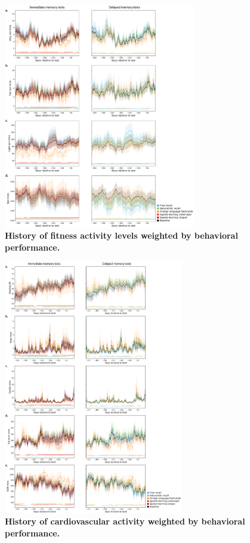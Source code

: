 \documentclass[10pt]{article}
\begin{document}
\begin{figure}[p]
  \centering
  \includegraphics[width=0.75\textwidth]{figs/weighted_timecourse_activity}
\caption{\textbf{History of fitness activity levels weighted by
    behavioral performance.}}
\label{fig:activity_timecourse}
\end{figure}

\begin{figure}[p]
  \centering
  \includegraphics[width=0.7\textwidth]{figs/weighted_timecourse_HR}
\caption{\textbf{History of cardiovascular activity weighted by
    behavioral performance.}}
\label{fig:HR_timecourse}
  \end{figure}
\end{document}
